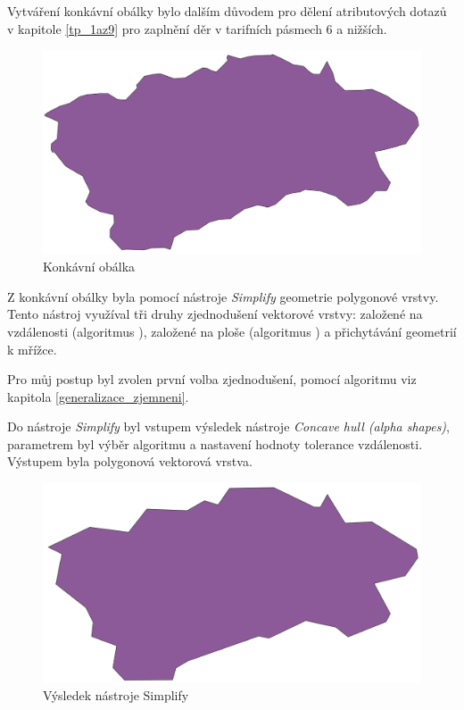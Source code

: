 Vytváření konkávní obálky bylo dalším důvodem pro dělení atributových dotazů v kapitole \ref{tp_1az9} pro 
zaplnění děr v tarifních pásmech 6 a nižších.  

\begin{figure}[H] \centering
    \includegraphics[width=400pt]{./pictures/concaveHull-P0B.png}
    \caption[Konkávní obálka]{Konkávní obálka}
	\label{fig:concaveHull-P0B}              
\end{figure} 

Z konkávní obálky byla pomocí nástroje \textit{Simplify}  geometrie polygonové vrstvy. Tento nástroj
využíval tři druhy zjednodušení vektorové vrstvy: založené na vzdálenosti (algoritmus ),
založené na ploše (algoritmus ) a přichytávání geometrií k mřížce.

Pro můj postup byl zvolen první volba zjednodušení, pomocí algoritmu  viz kapitola \ref{generalizace_zjemneni}.


Do nástroje \textit{Simplify} byl vstupem výsledek nástroje \textit{Concave hull (alpha shapes)}, parametrem byl výběr algoritmu 
a nastavení hodnoty tolerance vzdálenosti. Výstupem byla polygonová vektorová vrstva.

\begin{figure}[H] \centering
    \includegraphics[width=400pt]{./pictures/simplify-P0B.png}
    \caption[Výsledek nástroje Simplify]{Výsledek nástroje Simplify}
	\label{fig:simplify-P0B}                                
\end{figure}

